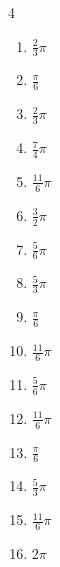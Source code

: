 \begin{multicols}{4}
\begin{enumerate}
  \item $\displaystyle \frac{2}{3}\pi$

  \item $\displaystyle \frac{\pi}{6}$

  \item $\displaystyle \frac{2}{3}\pi$

  \item $\displaystyle \frac{7}{4}\pi$

  \item $\displaystyle \frac{11}{6}\pi$

  \item $\displaystyle \frac{3}{2}\pi$

  \item $\displaystyle \frac{5}{6}\pi$

  \item $\displaystyle \frac{5}{3}\pi$

  \item $\displaystyle \frac{\pi}{6}$

\columnbreak %

  \item $\displaystyle \frac{11}{6}\pi$

  \item $\displaystyle \frac{5}{6}\pi$

  \item $\displaystyle \frac{11}{6}\pi$

  \item $\displaystyle \frac{\pi}{6}$

  \item $\displaystyle \frac{5}{3}\pi$

  \item $\displaystyle \frac{11}{6}\pi$

  \item $\displaystyle 2\pi$


\end{enumerate}
\end{multicols}
